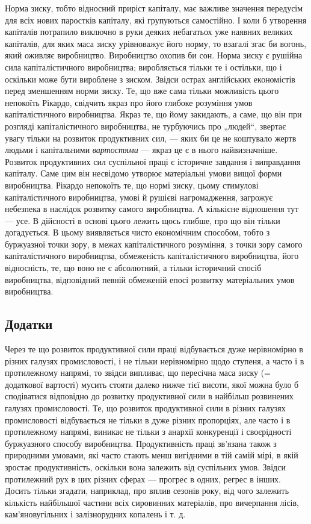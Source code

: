 Норма зиску, тобто відносний приріст капіталу, має важливе
значення передусім для всіх нових паростків капіталу, які групуються
самостійно. І коли б утворення капіталів потрапило
виключно в руки деяких небагатьох уже наявних великих
капіталів, для яких маса зиску урівноважує його норму, то
взагалі згас би вогонь, який оживляє виробництво. Виробництво
охопив би сон. Норма зиску є рушійна сила капіталістичного
виробництва; виробляється тільки те і остільки, що і оскільки
може бути вироблене з зиском. Звідси острах англійських економістів
перед зменшенням норми зиску. Те, що вже сама тільки
можливість цього непокоїть Рікардо, свідчить якраз про його
глибоке розуміння умов капіталістичного виробництва. Якраз те,
що йому закидають, а саме, що він при розгляді капіталістичного
виробництва, не турбуючись про „людей“, звертає увагу
тільки на розвиток продуктивних сил, — яких би це не коштувало
жертв людьми і капітальними \emph{вартостями} — якраз це є
в нього найвизначніше. Розвиток продуктивних сил суспільної
праці є історичне завдання і виправдання капіталу. Саме цим він
несвідомо утворює матеріальні умови вищої форми виробництва.
Рікардо непокоїть те, що нормі зиску, цьому стимулові капіталістичного
виробництва, умові й рушієві нагромадження, загрожує
небезпека в наслідок розвитку самого виробництва. А кількісне
відношення тут — усе. В дійсності в основі цього лежить щось
глибше, про що він тільки догадується. В цьому виявляється
чисто економічним способом, тобто з буржуазної точки зору,
в межах капіталістичного розуміння, з точки зору самого капіталістичного
виробництва, обмеженість капіталістичного виробництва,
його відносність, те, що воно не є абсолютний, а тільки
історичний спосіб виробництва, відповідний певній обмеженій
епосі розвитку матеріальних умов виробництва.

\subsection{Додатки}

Через те що розвиток продуктивної сили праці відбувається
дуже нерівномірно в різних галузях промисловості, і не тільки
нерівномірно щодо ступеня, а часто і в протилежному напрямі,
то звідси випливає, що пересічна маса зиску (= додаткової
вартості) мусить стояти далеко нижче тієї висоти, якої можна
було б сподіватися відповідно до розвитку продуктивної сили
в найбільш розвинених галузях промисловості. Те, що розвиток
продуктивної сили в різних галузях промисловості відбувається
не тільки в дуже різних пропорціях, але часто і в протилежному
напрямі, виникає не тільки з анархії конкуренції і своєрідності
буржуазного способу виробництва. Продуктивність праці
зв’язана також з природними умовами, які часто стають менш
вигідними в тій самій мірі, в якій зростає продуктивність, оскільки
вона залежить від суспільних умов. Звідси протилежний рух
в цих різних сферах — прогрес в одних, регрес в інших. Досить
тільки згадати, наприклад, про вплив сезонів року, від чого
залежить кількість найбільшої частини всіх сировинних матеріалів,
про вичерпання лісів, кам’яновугільних і залізнорудних
копалень і т. д.

